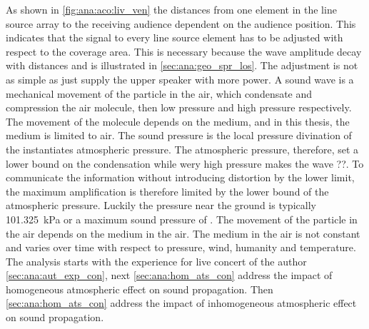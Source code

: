 
As shown in \autoref{fig:ana:aco:liv_ven} the distances from one element in the line source array to the receiving audience dependent on the audience position. This indicates that the signal to every line source element has to be adjusted with respect to the coverage area. This is necessary because the wave amplitude decay with distances and is illustrated in \autoref{sec:ana:geo_spr_los}. The adjustment is not as simple as just supply the upper speaker with more power. A sound wave is a mechanical movement of the particle in the air, which condensate and compression the air molecule, then low pressure and high pressure respectively. The movement of the molecule depends on the medium, and in this thesis, the medium is limited to air. The sound pressure is the local pressure divination of the instantiates atmospheric pressure. The atmospheric pressure, therefore, set a lower bound on the condensation while wery high pressure makes the wave ??. To communicate the information without introducing distortion by the lower limit, the maximum amplification is therefore limited by the lower bound of the atmospheric pressure. Luckily the pressure near the ground is typically \SI{101.325}{\kilo\pascal} or a maximum sound pressure of . The movement of the particle in the air depends on the medium in the air. The medium in the air is not constant and varies over time with respect to pressure, wind, humanity and temperature. The analysis starts with the experience for live concert of the author \autoref{sec:ana:aut_exp_con}, next \autoref{sec:ana:hom_ats_con} address the impact of homogeneous atmospheric effect on sound propagation. Then \autoref{sec:ana:hom_ats_con} address the impact of  inhomogeneous atmospheric effect on sound propagation. 


